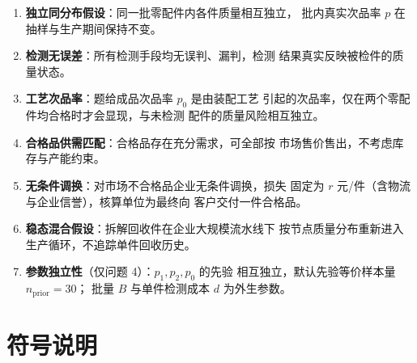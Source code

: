\documentclass[withoutpreface,bwprint]{cumcmthesis}
\begin{document}
\begin{enumerate}
    \item \textbf{独立同分布假设}：同一批零配件内各件质量相互独立，
    批内真实次品率 $p$ 在抽样与生产期间保持不变。
    \item \textbf{检测无误差}：所有检测手段均无误判、漏判，检测
    结果真实反映被检件的质量状态。
    \item \textbf{工艺次品率}：题给成品次品率 $p_0$ 是由装配工艺
    引起的次品率，仅在两个零配件均合格时才会显现，与未检测
    配件的质量风险相互独立。
    \item \textbf{合格品供需匹配}：合格品存在充分需求，可全部按
    市场售价售出，不考虑库存与产能约束。
    \item \textbf{无条件调换}：对市场不合格品企业无条件调换，损失
    固定为 $r$ 元/件（含物流与企业信誉），核算单位为最终向
    客户交付一件合格品。
    \item \textbf{稳态混合假设}：拆解回收件在企业大规模流水线下
    按节点质量分布重新进入生产循环，不追踪单件回收历史。
    \item \textbf{参数独立性}（仅问题 4）：$p_1, p_2, p_0$ 的先验
    相互独立，默认先验等价样本量 $n_{\mathrm{prior}} = 30$；
    批量 $B$ 与单件检测成本 $d$ 为外生参数。
\end{enumerate}

\section{符号说明}
\end{document}
